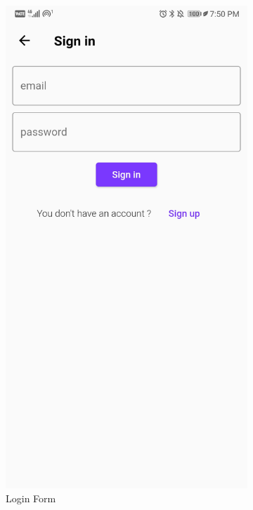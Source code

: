 \begin{appendices}
\begin{landscape}
\begin{figure}[h]
\begin{subfigure}{.25\textwidth}
    \includegraphics[width=.75\linewidth]{content/imgs/screen11.jpg}
    \caption{Login Form}
  \end{subfigure}%
  \begin{subfigure}{.25\textwidth}
    \centering

\end{subfigure}
\end{figure}
\end{landscape}
\end{appendices}
